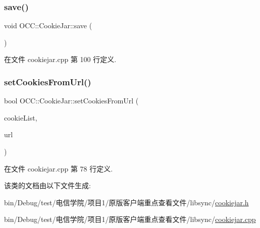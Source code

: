 \mbox{\label{class_o_c_c_1_1_cookie_jar_a3f1a5498c56e0a01480691a952b34d92}} 
\subsubsection{\texorpdfstring{save()}{save()}}
{\footnotesize\ttfamily void O\+C\+C\+::\+Cookie\+Jar\+::save (\begin{DoxyParamCaption}{ }\end{DoxyParamCaption})}



在文件 cookiejar.\+cpp 第 100 行定义.

\mbox{\label{class_o_c_c_1_1_cookie_jar_aaceb253821c62dd72d38e17918ec2e25}} 
\subsubsection{\texorpdfstring{set\+Cookies\+From\+Url()}{setCookiesFromUrl()}}
{\footnotesize\ttfamily bool O\+C\+C\+::\+Cookie\+Jar\+::set\+Cookies\+From\+Url (\begin{DoxyParamCaption}\item[{const Q\+List$<$ Q\+Network\+Cookie $>$ \&}]{cookie\+List,  }\item[{const Q\+Url \&}]{url }\end{DoxyParamCaption})}



在文件 cookiejar.\+cpp 第 78 行定义.



该类的文档由以下文件生成\+:\begin{DoxyCompactItemize}
\item 
bin/\+Debug/test/电信学院/项目1/原版客户端重点查看文件/libsync/\hyperlink{cookiejar_8h}{cookiejar.\+h}\item 
bin/\+Debug/test/电信学院/项目1/原版客户端重点查看文件/libsync/\hyperlink{cookiejar_8cpp}{cookiejar.\+cpp}\end{DoxyCompactItemize}
